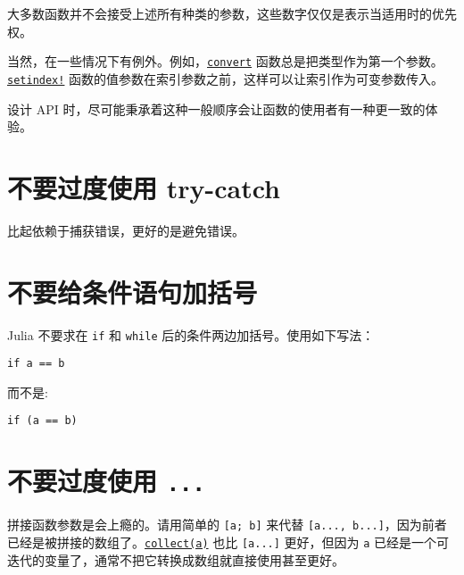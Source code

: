 大多数函数并不会接受上述所有种类的参数，这些数字仅仅是表示当适用时的优先权。



当然，在一些情况下有例外。例如，\hyperlink{1846942650946171605}{\texttt{convert}} 函数总是把类型作为第一个参数。\hyperlink{1309244355901386657}{\texttt{setindex!}} 函数的值参数在索引参数之前，这样可以让索引作为可变参数传入。



设计 API 时，尽可能秉承着这种一般顺序会让函数的使用者有一种更一致的体验。



\hypertarget{16340212137156679332}{}


\section{不要过度使用 try-catch}



比起依赖于捕获错误，更好的是避免错误。



\hypertarget{15308468417216899816}{}


\section{不要给条件语句加括号}



Julia 不要求在 \texttt{if} 和 \texttt{while} 后的条件两边加括号。使用如下写法：




\begin{verbatim}
if a == b
\end{verbatim}



而不是:




\begin{verbatim}
if (a == b)
\end{verbatim}



\hypertarget{13344988799401234550}{}


\section{不要过度使用 \texttt{...}}



拼接函数参数是会上瘾的。请用简单的 \texttt{[a; b]} 来代替 \texttt{[a..., b...]}，因为前者已经是被拼接的数组了。\hyperlink{6278865767444641812}{\texttt{collect(a)}} 也比 \texttt{[a...]} 更好，但因为 \texttt{a} 已经是一个可迭代的变量了，通常不把它转换成数组就直接使用甚至更好。




